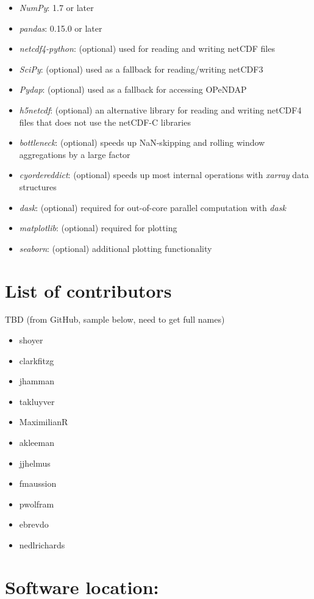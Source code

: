 \documentclass{jors}
\begin{document}
\begin{itemize}
\item \textit{NumPy}: 1.7 or later
\item \textit{pandas}: 0.15.0 or later
\item \textit{netcdf4-python}: (optional) used for reading and writing netCDF files
\item \textit{SciPy}: (optional) used as a fallback for reading/writing netCDF3
\item \textit{Pydap}: (optional) used as a fallback for accessing OPeNDAP
\item \textit{h5netcdf}: (optional) an alternative library for reading and writing netCDF4 files that does not use the netCDF-C libraries
\item \textit{bottleneck}: (optional) speeds up NaN-skipping and rolling window aggregations by a large factor
\item \textit{cyordereddict}: (optional) speeds up most internal operations with \textit{xarray} data structures
\item \textit{dask}: (optional) required for out-of-core parallel computation with \textit{dask}
\item \textit{matplotlib}: (optional) required for plotting
\item \textit{seaborn}: (optional) additional plotting functionality
\end{itemize}


\section*{List of contributors}

TBD (from GitHub, sample below, need to get full names)

\begin{itemize}
	\item shoyer
	\item clarkfitzg
	\item jhamman
	\item takluyver
	\item MaximilianR
	\item akleeman
	\item jjhelmus
	\item fmaussion
	\item pwolfram
	\item ebrevdo
	\item nedlrichards
\end{itemize}

\section*{Software location:}
\end{document}
